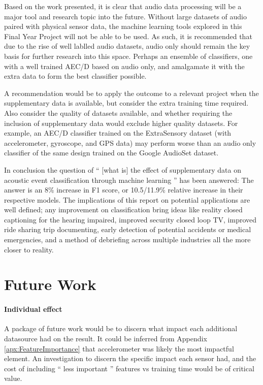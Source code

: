 \documentclass{UoNMCHA}
\newcommand{\inlineQuote}[1]{`` #1 ''}
\newcommand{\aref}[1] {Appendix \ref{#1}}
\numberwithin{equation}{section}
\begin{document}
Based on the work presented, it is clear that audio data processing will be a major tool and research topic into the future. Without large datasets of audio paired with physical sensor data, the machine learning tools explored in this Final Year Project will not be able to be used. As such, it is recommended that due to the rise of well lablled audio datasets, audio only should remain the key basis for further research into this space. Perhaps an ensemble of classifiers, one with a well trained AEC/D based on audio only, and amalgamate it with the extra data to form the best classifier possible.

A recommendation would be to apply the outcome to a relevant project when the supplementary data is available, but consider the extra training time required. Also consider the quality of datasets available, and whether requiring the inclusion of supplementary data would exclude higher quality datasets. For example, an AEC/D classifier trained on the ExtraSensory dataset (with accelerometer, gyroscope, and GPS data) may perform worse than an audio only classifier of the same design trained on the Google AudioSet dataset.

In conclusion the question of \inlineQuote{[what is] the effect of supplementary data on acoustic event classification through machine learning} has been answered: The answer is an 8\% increase in F1 score, or 10.5/11.9\% relative increase in their respective models. The implications of this report on potential applications are well defined; any improvement on classification bring ideas like reality closed captioning for the hearing impaired, improved security closed loop TV, improved ride sharing trip documenting, early detection of potential accidents or medical emergencies, and a method of debriefing across multiple industries all the more closer to reality.



\clearpage \section{Future Work}\label{sec:futurework}
\paragraph{Individual effect}
A package of future work would be to discern what impact each additional datasource had on the result. It could be inferred from \aref{apx:FeatureImportance} that accelerometer was likely the most impactful element. An investigation to discern the specific impact each sensor had, and the cost of including \inlineQuote{less important} features vs training time would be of critical value. 
\end{document}
